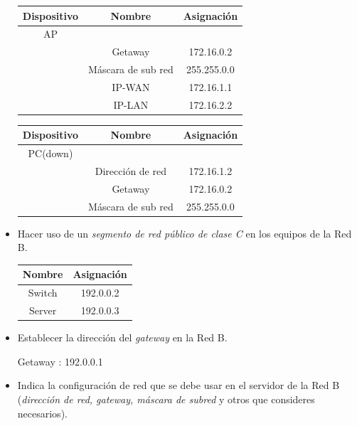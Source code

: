 \documentclass[spanish,12pt,letterpaper]{article}
\begin{document}
\begin{itemize}
  \begin{table}[H]
    \centering
    \begin{tabular}{| c | c | c |}\hline
      Dispositivo & Nombre & Asignación\\ \hline
      AP & & \\ \hline
      & Getaway & 172.16.0.2 \\ \hline
      & Máscara de sub red & 255.255.0.0 \\ \hline
      & IP-WAN & 172.16.1.1 \\ \hline
      & IP-LAN & 172.16.2.2 \\ \hline
    \end{tabular}
  \end{table}

  \begin{table}[H]
    \centering
    \begin{tabular}{| c | c | c |}\hline
      Dispositivo & Nombre & Asignación\\ \hline
      PC(down) & & \\ \hline
      & Dirección de red & 172.16.1.2 \\ \hline
      & Getaway & 172.16.0.2 \\ \hline
      & Máscara de sub red & 255.255.0.0 \\ \hline
    \end{tabular}
  \end{table}

\item Hacer uso de un \textit{segmento de red público de clase C} en los equipos
  de la Red B.

  \begin{table}[H]
    \centering
    \begin{tabular}{|c | c |}\hline
      Nombre & Asignación \\ \hline
      Switch & 192.0.0.2  \\ \hline
      Server & 192.0.0.3   \\ \hline   
    \end{tabular}
  \end{table}
  
\item Establecer la dirección del \textit{gateway} en la Red B.

  Getaway : 192.0.0.1
  
\item Indica la configuración de red que se debe usar en el servidor de la Red B
  (\textit{dirección de red, gateway, máscara de subred} y otros que consideres
  necesarios).
  

\end{itemize}
\end{document}
